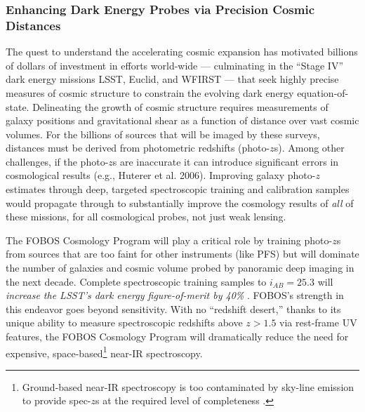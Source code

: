 \documentclass[oneside,11pt]{amsart}
\begin{document}
\subsubsection{Enhancing Dark Energy Probes via Precision Cosmic Distances}
\label{sec:cosmology}

The quest to understand the accelerating cosmic expansion has motivated billions of dollars of investment in efforts world-wide ---
culminating in the ``Stage IV'' dark energy missions LSST, Euclid, and WFIRST --- that seek highly precise measures of cosmic structure to constrain the
evolving dark energy equation-of-state. Delineating the growth of cosmic structure requires measurements of galaxy positions and
gravitational shear as a function of distance over vast cosmic volumes.  For the billions of sources that will be
imaged by these surveys, distances must be derived from photometric redshifts (photo-$z$s). Among other challenges, if the photo-$z$s are inaccurate it can introduce significant errors in cosmological
results (e.g., Huterer et al. 2006). Improving galaxy photo-$z$ estimates through deep, targeted
spectroscopic training and calibration samples would propagate through
to substantially improve the cosmology results of \emph{all} of these missions, for all
cosmological probes, not just weak lensing.

The FOBOS Cosmology Program will play a critical role by training photo-$z$s from sources that are too faint for other
instruments (like PFS) but will dominate the number of galaxies and cosmic volume probed by panoramic deep imaging in
the next decade.  Complete spectroscopic training samples to $i_{AB} = 25.3$ will \emph{increase the LSST's dark energy
figure-of-merit by 40\%} \citep{newman15}. FOBOS's strength in this endeavor goes beyond sensitivity.  With no
``redshift desert,'' thanks to its unique ability to measure spectroscopic redshifts above $z > 1.5$ via rest-frame UV
features, the FOBOS Cosmology Program will dramatically reduce the need for expensive,
space-based\footnote{Ground-based near-IR spectroscopy is too contaminated by sky-line emission to provide spec-$z$s at
the required level of completeness \citep{newman15}.} near-IR spectroscopy.
\end{document}

